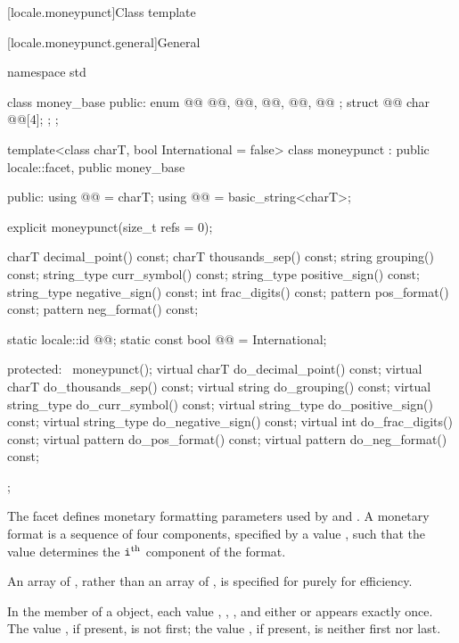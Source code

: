 [locale.moneypunct]{Class template }

[locale.moneypunct.general]{General}

%
%
\begin{codeblock}
namespace std {
  class money_base {
  public:
    enum @@ { @@, @@, @@, @@, @@ };
    struct @@ { char @@[4]; };
  };

  template<class charT, bool International = false>
  class moneypunct : public locale::facet, public money_base {
  public:
    using @@   = charT;
    using @@ = basic_string<charT>;

    explicit moneypunct(size_t refs = 0);

    charT       decimal_point() const;
    charT       thousands_sep() const;
    string      grouping()      const;
    string_type curr_symbol()   const;
    string_type positive_sign() const;
    string_type negative_sign() const;
    int         frac_digits()   const;
    pattern     pos_format()    const;
    pattern     neg_format()    const;

    static locale::id @@;
    static const bool @@ = International;

  protected:
    ~moneypunct();
    virtual charT       do_decimal_point() const;
    virtual charT       do_thousands_sep() const;
    virtual string      do_grouping()      const;
    virtual string_type do_curr_symbol()   const;
    virtual string_type do_positive_sign() const;
    virtual string_type do_negative_sign() const;
    virtual int         do_frac_digits()   const;
    virtual pattern     do_pos_format()    const;
    virtual pattern     do_neg_format()    const;
  };
}
\end{codeblock}

\pnum
The  facet defines monetary formatting parameters
used by  and .
A monetary format is a sequence of four components,
specified by a  value ,
such that the  value 
determines the $\tcode{i}^\text{th}$ component of the format.
\begin{footnote}
An array of ,
rather than an array of ,
is specified for  purely for efficiency.
\end{footnote}
In the  member of a  object,
each value , , , and
either  or 
appears exactly once.
The value , if present, is not first;
the value , if present, is neither first nor last.

